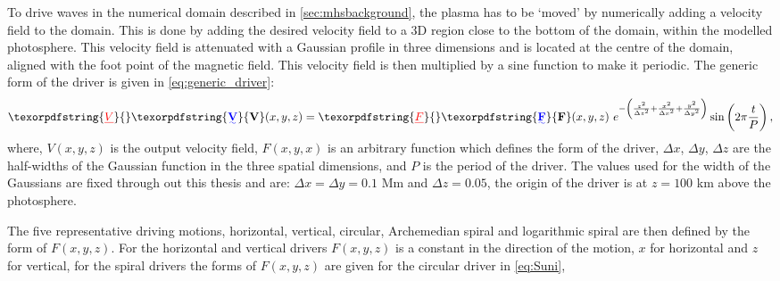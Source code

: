 \documentclass[a4paper,12pt,fourier,authoryear,custommargin]{Classes/PhDThesisPSnPDF}
\renewcommand{\vec}{\mathbf}
\providecommand{\DIFaddtex}[1]{{\protect\color{blue}\uwave{#1}}} %
\providecommand{\DIFdeltex}[1]{{\protect\color{red}\sout{#1}}}                      %
\providecommand{\DIFaddbegin}{} %
\providecommand{\DIFaddend}{} %
\providecommand{\DIFdelbegin}{} %
\providecommand{\DIFdelend}{} %
\providecommand{\DIFadd}[1]{\texorpdfstring{\DIFaddtex{#1}}{#1}} %
\providecommand{\DIFdel}[1]{\texorpdfstring{\DIFdeltex{#1}}{}} %
\begin{document}
To drive waves in the numerical domain described in \cref{sec:mhsbackground}, the plasma has to be `moved' by numerically adding a velocity field to the domain.
This is done by adding the desired velocity field to a 3D region close to the bottom of the domain, within the modelled photosphere.
This velocity field is attenuated with a Gaussian profile in three dimensions and is located at the centre of the domain, aligned with the foot point of the magnetic field.
This velocity field is then multiplied by a sine function to make it periodic. The generic form of the driver is given in \cref{eq:generic_driver}:
\begin{equation}
    \DIFdelbegin \DIFdel{V}\DIFdelend \DIFaddbegin \DIFadd{\vec{V}}\DIFaddend (x,y,z) = \DIFdelbegin \DIFdel{F}\DIFdelend \DIFaddbegin \DIFadd{\vec{F}}\DIFaddend (x,y,z) \ e^{-\left(\frac{z^2}{\Delta z^2} + \frac{x^2}{\Delta x^2} + \frac{y^2}{\Delta y^2}\right)} \sin \left(2\pi \frac{t}{P}\right),
    \label{eq:generic_driver}
\end{equation}
where, \DIFdelbegin \DIFdel{$V(x,y,z)$ }\DIFdelend \DIFaddbegin \DIFadd{$\vec{V}(x,y,z)$ }\DIFaddend is the output velocity field, \DIFdelbegin \DIFdel{$F(x,y,x)$ }\DIFdelend \DIFaddbegin \DIFadd{$\vec{F}(x,y,x)$ }\DIFaddend is an arbitrary function which defines the form of the driver, $\Delta x$, $\Delta y$, $\Delta z$ are the half-widths of the Gaussian function in the three spatial dimensions, and $P$ is the period of the driver.
The values used for the width of the Gaussians are fixed through out this thesis and are: $\Delta x = \Delta y = 0.1$ Mm and $\Delta z = 0.05$, the origin of the driver is at $z = 100$ km above the photosphere.

The five representative driving motions, horizontal, vertical, circular, Archemedian spiral and logarithmic spiral are then defined by the form of \DIFdelbegin \DIFdel{$F(x,y,z)$}\DIFdelend \DIFaddbegin \DIFadd{$\vec{F}(x,y,z)$}\DIFaddend . For the horizontal and vertical drivers \DIFdelbegin \DIFdel{$F(x,y,z)$ }\DIFdelend \DIFaddbegin \DIFadd{$\vec{F}(x,y,z)$ }\DIFaddend is a constant in the direction of the motion, $x$ for horizontal and $z$ for vertical, for the spiral drivers the forms of \DIFdelbegin \DIFdel{$F(x,y,z)$ }\DIFdelend \DIFaddbegin \DIFadd{$\vec{F}(x,y,z)$ }\DIFaddend are given for the circular driver in \cref{eq:Suni},
\end{document}
